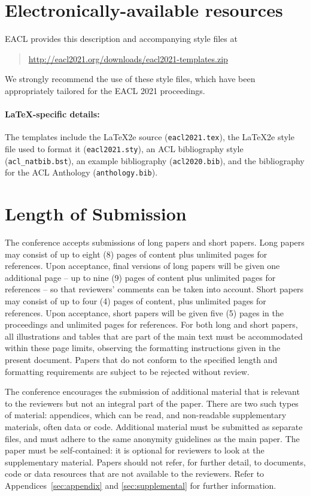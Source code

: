 \documentclass[11pt,a4paper]{article}
\begin{document}
\section{Electronically-available resources}

EACL provides this description and accompanying style files at
\begin{quote}
\url{http://eacl2021.org/downloads/eacl2021-templates.zip}
\end{quote}
We strongly recommend the use of these style files, which have been appropriately tailored for the EACL 2021 proceedings.

\paragraph{\LaTeX-specific details:}
The templates include the \LaTeX2e{} source (\texttt{\small eacl2021.tex}),
the \LaTeX2e{} style file used to format it (\texttt{\small eacl2021.sty}),
an ACL bibliography style (\texttt{\small acl\_natbib.bst}),
an example bibliography (\texttt{\small acl2020.bib}),
and the bibliography for the ACL Anthology (\texttt{\small anthology.bib}).


\section{Length of Submission}
\label{sec:length}

The conference accepts submissions of long papers and short papers.
Long papers may consist of up to eight (8) pages of content plus unlimited pages for references.
Upon acceptance, final versions of long papers will be given one additional page -- up to nine (9) pages of content plus unlimited pages for references -- so that reviewers' comments can be taken into account.
Short papers may consist of up to four (4) pages of content, plus unlimited pages for references.
Upon acceptance, short papers will be given five (5) pages in the proceedings and unlimited pages for references. 
For both long and short papers, all illustrations and tables that are part of the main text must be accommodated within these page limits, observing the formatting instructions given in the present document.
Papers that do not conform to the specified length and formatting requirements are subject to be rejected without review.

The conference encourages the submission of additional material that is relevant to the reviewers but not an integral part of the paper.
There are two such types of material: appendices, which can be read, and non-readable supplementary materials, often data or code.
Additional material must be submitted as separate files, and must adhere to the same anonymity guidelines as the main paper.
The paper must be self-contained: it is optional for reviewers to look at the supplementary material.
Papers should not refer, for further detail, to documents, code or data resources that are not available to the reviewers.
Refer to Appendices~\ref{sec:appendix} and \ref{sec:supplemental} for further information. 
\end{document}
